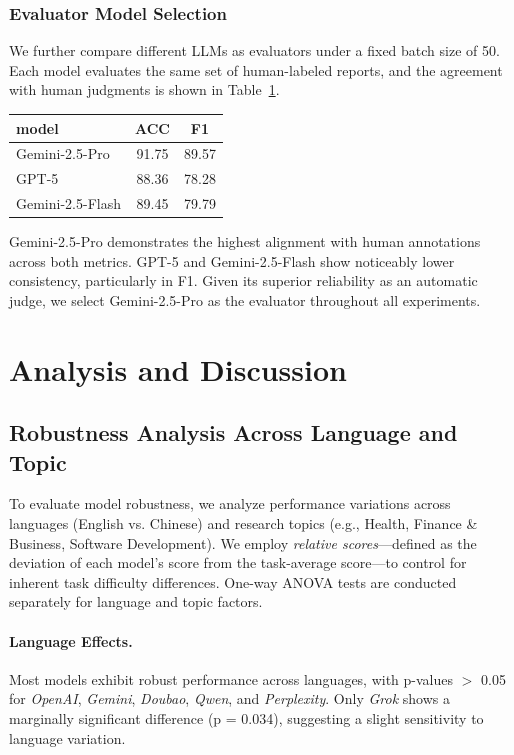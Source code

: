 \documentclass[11pt]{article}
\begin{document}
\subsubsection{Evaluator Model Selection}
We further compare different LLMs as evaluators under a fixed batch size of 50. 
Each model evaluates the same set of human-labeled reports, and the agreement with human judgments is shown in Table~\ref{tab:evaluator}.

\begin{table}[h]
    \centering
    \begin{tabular}{lcc}
    \toprule
    \textbf{model} & \textbf{ACC} & \textbf{F1} \\
    \midrule
    Gemini-2.5-Pro   & 91.75 & 89.57 \\
    GPT-5            & 88.36 & 78.28 \\
    Gemini-2.5-Flash & 89.45 & 79.79 \\
    \bottomrule
    \end{tabular}
    \label{tab:evaluator}
\end{table}

Gemini-2.5-Pro demonstrates the highest alignment with human annotations across both metrics. 
GPT-5 and Gemini-2.5-Flash show noticeably lower consistency, particularly in F1. 
Given its superior reliability as an automatic judge, we select Gemini-2.5-Pro as the evaluator throughout all experiments.

\section{Analysis and Discussion}

\subsection{Robustness Analysis Across Language and Topic}

To evaluate model robustness, we analyze performance variations across languages (English vs. Chinese) and research topics (e.g., Health, Finance \& Business, Software Development). We employ \textit{relative scores}---defined as the deviation of each model's score from the task-average score---to control for inherent task difficulty differences. One-way ANOVA tests are conducted separately for language and topic factors.

\paragraph{Language Effects.}
Most models exhibit robust performance across languages, with p-values $>$ 0.05 for \textit{OpenAI}, \textit{Gemini}, \textit{Doubao}, \textit{Qwen}, and \textit{Perplexity}. Only \textit{Grok} shows a marginally significant difference (p = 0.034), suggesting a slight sensitivity to language variation.
\end{document}
